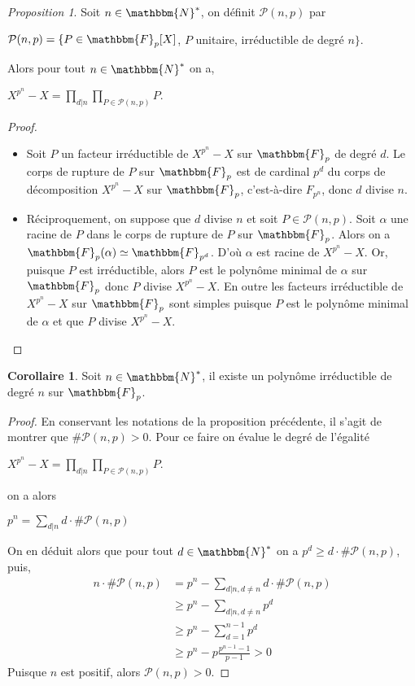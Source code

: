 \documentclass[12pt]{article}
\theoremstyle{remark}\newtheorem{note}{Note}
\theoremstyle{remark}\newtheorem{nota}{Notation}
\newcommand{\N}{\mathbbm{N}}
\newcommand{\F}{\mathbbm{F}}
\newtheorem{prop}{Proposition}
\theoremstyle{definition}
\newtheorem{coro}{Corollaire}
\begin{document}
\begin{prop}
Soit $n \in \N^{*}$, on définit $\mathcal{P} (n,p)$ par
\begin{center}
$\mathcal{P} (n,p) = \{ P \in \F_p [X]$, $P$ unitaire, irréductible de degré $n \}$.
\end{center}
Alors pour tout $n \in \N^{*}$ on a,
\begin{center}
$\displaystyle X^{p^n} - X = \prod_{d | n} \prod_{P \in \mathcal{P}(n,p)} P.$
\end{center}
\end{prop}
\begin{proof}
\begin{itemize}
\item Soit $P$ un facteur irréductible de $X^{p^n} - X$ sur $\F_p$ de degré $d$. Le corps de rupture de $P$ sur $\F_p$ est de cardinal $p^d$ du corps de décomposition $X^{p^n} - X$ sur $\F_p$, c'est-à-dire $F_{p^n}$, donc $d$ divise $n$.
\item Réciproquement, on suppose que $d$ divise $n$ et soit $P \in \mathcal{P} (n,p)$. Soit $\alpha$ une racine de $P$ dans le corps de rupture de $P$ sur $\F_p$. Alors on a $\F_p (\alpha) \simeq \F_{p^d}$. D'où $\alpha$ est racine de $X^{p^n} - X$. Or, puisque $P$ est irréductible, alors $P$ est le polynôme minimal de $\alpha$ sur $\F_p$ donc $P$ divise $X^{p^n} - X$. En outre les facteurs irréductible de $X^{p^n} - X$ sur $\F_p$ sont simples puisque $P$ est le polynôme minimal de $\alpha$ et que $P$ divise $X^{p^n} - X$.
\end{itemize}
\end{proof}
\begin{coro}
Soit $n \in \N^{*}$, il existe un polynôme irréductible de degré $n$ sur $\F_p$.
\end{coro}
\begin{proof}
En conservant les notations de la proposition précédente, il s'agit de montrer que $\# \mathcal{P} (n,p) > 0$. Pour ce faire on évalue le degré de l'égalité
\begin{center}
$\displaystyle X^{p^n} - X = \prod_{d | n} \prod_{P \in \mathcal{P}(n,p)} P.$
\end{center}
on a alors
\begin{center}
$\displaystyle p^n = \sum_{d | n} d \cdot \# \mathcal{P} (n,p)$
\end{center}
On en déduit alors que pour tout $d \in \N^{*}$ on a $p^d \geq d \cdot \# \mathcal{P} (n,p)$, puis,
\begin{align*}
\displaystyle
n \cdot \# \mathcal{P} (n,p) &= p^n - \sum_{d | n , d \neq n} d \cdot \# \mathcal{P} (n,p)\\
&\geq p^n - \sum_{d | n , d \neq n} p^d\\
&\geq p^n - \sum_{d =1}^{n-1} p^d\\
&\geq p^n - p \frac{p^{n-1} - 1}{p-1} > 0
\end{align*}
Puisque $n$ est positif, alors $\mathcal{P} (n,p) > 0$.
\end{proof}
\end{document}
